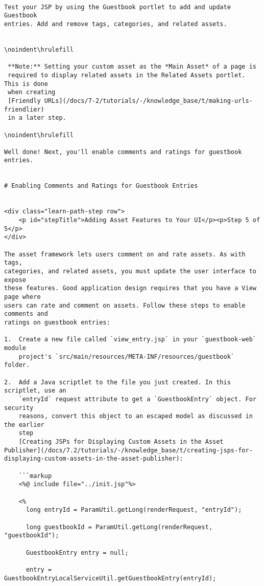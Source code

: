 \begin{verbatim}

Test your JSP by using the Guestbook portlet to add and update Guestbook 
entries. Add and remove tags, categories, and related assets. 


\noindent\hrulefill

 **Note:** Setting your custom asset as the *Main Asset* of a page is
 required to display related assets in the Related Assets portlet. This is done
 when creating
 [Friendly URLs](/docs/7-2/tutorials/-/knowledge_base/t/making-urls-friendlier)
 in a later step.

\noindent\hrulefill

Well done! Next, you'll enable comments and ratings for guestbook entries. 


# Enabling Comments and Ratings for Guestbook Entries


<div class="learn-path-step row">
    <p id="stepTitle">Adding Asset Features to Your UI</p><p>Step 5 of 5</p>
</div>

The asset framework lets users comment on and rate assets. As with tags,
categories, and related assets, you must update the user interface to expose
these features. Good application design requires that you have a View page where
users can rate and comment on assets. Follow these steps to enable comments and
ratings on guestbook entries: 

1.  Create a new file called `view_entry.jsp` in your `guestbook-web` module 
    project's `src/main/resources/META-INF/resources/guestbook` folder. 

2.  Add a Java scriptlet to the file you just created. In this scriptlet, use an 
    `entryId` request attribute to get a `GuestbookEntry` object. For security
    reasons, convert this object to an escaped model as discussed in the earlier
    step 
    [Creating JSPs for Displaying Custom Assets in the Asset Publisher](/docs/7.2/tutorials/-/knowledge_base/t/creating-jsps-for-displaying-custom-assets-in-the-asset-publisher):

    ```markup
    <%@ include file="../init.jsp"%>

    <%
      long entryId = ParamUtil.getLong(renderRequest, "entryId");

      long guestbookId = ParamUtil.getLong(renderRequest, "guestbookId");

      GuestbookEntry entry = null;

      entry = GuestbookEntryLocalServiceUtil.getGuestbookEntry(entryId);


\end{verbatim}
